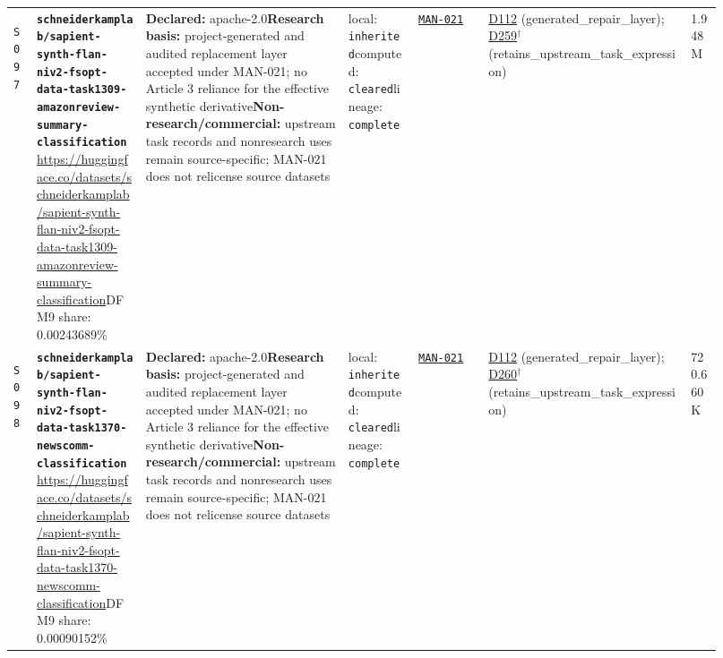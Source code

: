\documentclass[9pt,a4paper]{article}
\newcommand{\srcid}[1]{\hypertarget{src:#1}{\texttt{#1}}}
\begin{document}
\begin{landscape}
\begin{longtable}{@{}L{0.03\linewidth}L{0.14\linewidth}L{0.26\linewidth}L{0.09\linewidth}L{0.09\linewidth}L{0.265\linewidth}L{0.045\linewidth}@{}}
\srcid{S097} & \textbf{\nolinkurl{schneiderkamplab/sapient-synth-flan-niv2-fsopt-data-task1309-amazonreview-summary-classification}}\newline \url{https://huggingface.co/datasets/schneiderkamplab/sapient-synth-flan-niv2-fsopt-data-task1309-amazonreview-summary-classification}\newline DFM9 share: 0.00243689\% & \textbf{Declared:} apache-2.0\newline \textbf{Research basis:} project-generated and audited replacement layer accepted under MAN-021; no Article 3 reliance for the effective synthetic derivative\newline \textbf{Non-research/commercial:} upstream task records and nonresearch uses remain source-specific; MAN-021 does not relicense source datasets & local: \texttt{inherited}\newline computed: \texttt{cleared}\newline lineage: \texttt{complete} & \hyperlink{manual:MAN-021}{\texttt{MAN-021}} & \hyperlink{dep:D112}{D112} (generated\_repair\_layer); \hyperlink{dep:D259}{D259}$^{\dagger}$ (retains\_upstream\_task\_expression) & 1.948M \\
\srcid{S098} & \textbf{\nolinkurl{schneiderkamplab/sapient-synth-flan-niv2-fsopt-data-task1370-newscomm-classification}}\newline \url{https://huggingface.co/datasets/schneiderkamplab/sapient-synth-flan-niv2-fsopt-data-task1370-newscomm-classification}\newline DFM9 share: 0.00090152\% & \textbf{Declared:} apache-2.0\newline \textbf{Research basis:} project-generated and audited replacement layer accepted under MAN-021; no Article 3 reliance for the effective synthetic derivative\newline \textbf{Non-research/commercial:} upstream task records and nonresearch uses remain source-specific; MAN-021 does not relicense source datasets & local: \texttt{inherited}\newline computed: \texttt{cleared}\newline lineage: \texttt{complete} & \hyperlink{manual:MAN-021}{\texttt{MAN-021}} & \hyperlink{dep:D112}{D112} (generated\_repair\_layer); \hyperlink{dep:D260}{D260}$^{\dagger}$ (retains\_upstream\_task\_expression) & 720.660K \\

\end{longtable}
\end{landscape}
\end{document}
